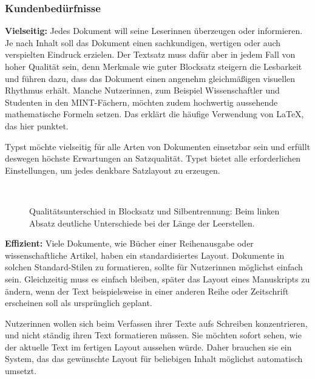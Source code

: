 \documentclass[11pt, a4paper]{article}
\newcommand{\gender}{\raisebox{-.25em}{*}}
\renewcommand{\glossary} {\marginsymbol{$\hookrightarrow$}}
\newcommand{\marginsymbol}[1] {\protect\marginsymbolhelper{#1}}
\newcommand{\marginsymbolhelper}[1] {\tabto*{-1cm}\makebox[0cm]{#1}\tabto*{\TabPrevPos}}
\begin{document}
\subsubsection*{Kundenbedürfnisse}


\textbf{Vielseitig:} Jedes Dokument will seine Leser\gender{}innen überzeugen oder informieren. Je nach Inhalt soll das Dokument einen sachkundigen, wertigen oder auch verspielten Eindruck erzielen. Der Textsatz muss dafür aber in jedem Fall von hoher Qualität sein, denn Merkmale wie guter \glossary Blocksatz steigern die Lesbarkeit und führen dazu, dass das Dokument einen angenehm gleichmäßigen visuellen Rhythmus erhält. Manche Nutzer\gender{}innen, zum Beispiel Wissenschaftler und Studenten in den \glossary MINT-Fächern, möchten zudem hochwertig aussehende mathematische Formeln setzen. Das erklärt die häufige Verwendung von LaTeX, das hier punktet.

Typst möchte vielseitig für alle Arten von Dokumenten einsetzbar sein und erfüllt deswegen höchste Erwartungen an Satzqualität. Typst bietet alle erforderlichen Einstellungen, um jedes denkbare Satzlayout zu erzeugen.

\begin{figure}
    \centering
    ~ %
    \caption{Qualitätsunterschied in Blocksatz und Silbentrennung: 
  Beim linken Absatz deutliche Unterschiede bei der Länge der Leerstellen.}
\end{figure}

\textbf{Effizient:} Viele Dokumente, wie Bücher einer Reihenausgabe oder wissenschaftliche Artikel, haben ein standardisiertes Layout. Dokumente in solchen Standard-Stilen zu formatieren, sollte für Nutzer\gender{}innen möglichst einfach sein. Gleichzeitig muss es einfach bleiben, später das Layout eines Manuskripts zu ändern, wenn der Text beispielsweise in einer anderen Reihe oder Zeitschrift erscheinen soll als ursprünglich geplant.

Nutzer\gender{}innen wollen sich beim Verfassen ihrer Texte aufs Schreiben konzentrieren, und nicht  ständig ihren Text formatieren müssen. Sie möchten sofort sehen, wie der aktuelle Text im fertigen Layout aussehen würde. Daher brauchen sie ein System, das das gewünschte Layout für beliebigen Inhalt möglichst automatisch umsetzt.
\end{document}
